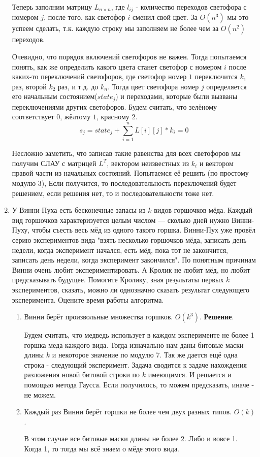 \begin{enumerate}
	Теперь заполним матрицу $L_{n\times n}$, где $l_{ij}$ - количество переходов светофора с номером $j$, после того, как светофор $i$ сменил свой цвет. За $O(n^3)$ мы это успеем сделать, т.к. каждую строку мы заполняем не более чем за $O(n^2)$ переходов. 
	
	Очевидно, что порядок включений светофоров не важен. Тогда попытаемся понять, как же определить какого цвета станет светофор с номером $i$ после каких-то переключений светофоров, где светофор номер $1$ переключится $k_1$ раз, второй $k_2$ раз, и т.д. до $k_n$. Тогда цвет светофора номер $j$ определяется его начальным состоянием($state_j$) и переходами, которые были вызваны переключениями других светофоров. Будем считать, что зелёному соответствует $0$, жёлтому $1$, красному $2$.
	\begin{equation*}
		s_j = state_j + \sum\limits_{i = 1}^{n} L[i][j] * k_i = 0
	\end{equation*}
	
	Несложно заметить, что записав такие равенства для всех светофоров мы получим СЛАУ с матрицей $L^T$, вектором неизвестных из $k_i$ и вектором правой части из начальных состояний. Попытаемся её решить (по простому модулю 3), Если получится, то последовательность переключений будет решением, если решения нет, то и последовательности тоже нет.
	 
	\item У Винни-Пуха есть бесконечные запасы из $k$ видов горшочков мёда. Каждый вид горшочков характеризуется 
	целым числом — сколько дней нужно Винни-Пуху, чтобы съесть весь мёд из одного такого горшка. Винни-Пух уже 
	провёл серию экспериментов вида "взять несколько горшочков мёда, записать день недели, когда эксперимент 
	начался, есть мёд, пока тот не закончится, записать день недели, когда эксперимент закончился". По понятным 
	причинам Винни очень любит экспериментировать. А Кролик не любит мёд, но любит предсказывать будущее. Помогите 
	Кролику, зная результаты первых $k$ экспериментов, сказать, можно ли однозначно сказать результат следующего 
	эксперимента. Оцените время работы алгоритма.
	\begin{enumerate}
		\item Винни берёт произвольные множества горшков. $O(k^3)$.
		\textbf{Решение}. 
		
		Будем считать, что медведь использует в каждом эксперименте не более 1 горшка меда каждого вида. Тогда 
		изначально нам даны битовые маски длины $k$ и некоторое значение по модулю 7. Так же дается ещё одна 
		строка - следующий эксперимент. Задача сводится к задаче нахождения разложения новой битовой строки по 
		$k$ имеющимся. И решается и помощью метода Гаусса. Если получилось, то можем предсказать, иначе - не 
		можем. 
		\item Каждый раз Винни берёт горшки не более чем двух разных типов. $O(k)$.
		
		В этом случае все битовые маски длины не более 2. Либо и вовсе 1. Когда 1, то тогда мы всё знаем о мёде этого вида. 
	\end{enumerate}
	
\end{enumerate}



